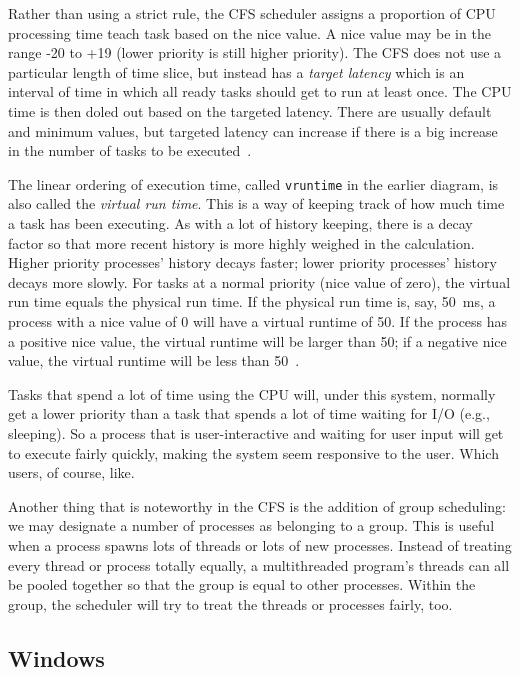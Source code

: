 Rather than using a strict rule, the CFS scheduler assigns a proportion of CPU processing time teach task based on the nice value. A nice value may be in the range -20 to +19 (lower priority is still higher priority). The CFS does not use a particular length of time slice, but instead has a \textit{target latency} which is an interval of time in which all ready tasks should get to run at least once. The CPU time is then doled out based on the targeted latency. There are usually default and minimum values, but targeted latency can increase if there is a big increase in the number of tasks to be executed~\cite{osc}.

The linear ordering of execution time, called \texttt{vruntime} in the earlier diagram, is also called the \textit{virtual run time}. This is a way of keeping track of how much time a task has been executing. As with a lot of history keeping, there is a decay factor  so that more recent history is more highly weighed in the calculation. Higher priority processes' history decays faster; lower priority processes' history decays more slowly. For tasks at a normal priority (nice value of zero), the virtual run time equals the physical run time. If the physical run time is, say, 50~ms, a process with a nice value of 0 will have a virtual runtime of 50. If the process has a positive nice value, the virtual runtime will be larger than 50; if a negative nice value, the virtual runtime will be less than 50~\cite{osc}.

Tasks that spend a lot of time using the CPU will, under this system, normally get a lower priority than a task that spends a lot of time waiting for I/O (e.g., sleeping). So a process that is user-interactive and waiting for user input will get to execute fairly quickly, making the system seem responsive to the user. Which users, of course, like.

Another thing that is noteworthy in the CFS is the addition of group scheduling: we may designate a number of processes as belonging to a group. This is useful when a process spawns lots of threads or lots of new processes. Instead of treating every thread or process totally equally, a multithreaded program's threads can all be pooled together so that the group is equal to other processes. Within the group, the scheduler will try to treat the threads or processes fairly, too.

\subsection*{Windows}

